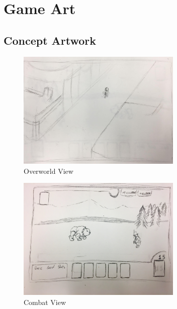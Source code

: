 \documentclass[12pt,titlepage]{article}
\begin{document}
\newpage
\section{Game Art}
%

\subsection{Concept Artwork}\label{sec:concept_art}

\begin{figure}[H]
    \caption{Overworld View}
    \label{fig:overview}
    \centering
    \includegraphics[width=0.7\textwidth]{../../graphics/overview}
\end{figure}

\begin{figure}[H]
    \caption{Combat View}
    \label{fig:combat}
    \centering
    \includegraphics[width=0.7\textwidth]{../../graphics/combat}
\end{figure}
\end{document}
